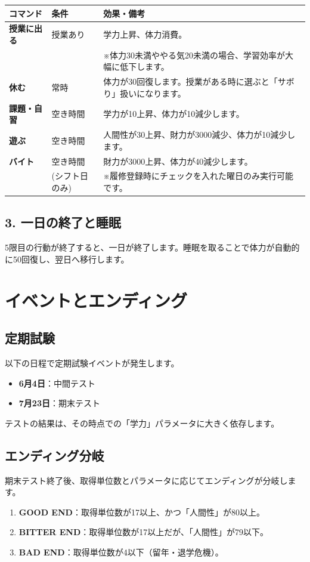 \documentclass[a4paper,11pt]{ltjsarticle}
\begin{document}
\begin{table}[h]
    \centering
    \begin{tabular}{llp{8cm}}
        \toprule
        \textbf{コマンド}  & \textbf{条件} & \textbf{効果・備考}                     \\
        \midrule
        \textbf{授業に出る} & 授業あり        & 学力上昇、体力消費。                         \\
                       &             & ※体力30未満ややる気20未満の場合、学習効率が大幅に低下します。  \\
        \textbf{休む}    & 常時          & 体力が30回復します。授業がある時に選ぶと「サボり」扱いになります。 \\
        \textbf{課題・自習} & 空き時間        & 学力が10上昇、体力が10減少します。                \\
        \textbf{遊ぶ}    & 空き時間        & 人間性が30上昇、財力が3000減少、体力が10減少します。     \\
        \textbf{バイト}   & 空き時間        & 財力が3000上昇、体力が40減少します。              \\
                       & (シフト日のみ)    & ※履修登録時にチェックを入れた曜日のみ実行可能です。         \\
        \bottomrule
    \end{tabular}
\end{table}

\subsection{3. 一日の終了と睡眠}
5限目の行動が終了すると、一日が終了します。睡眠を取ることで体力が自動的に50回復し、翌日へ移行します。

\section{イベントとエンディング}

\subsection{定期試験}
以下の日程で定期試験イベントが発生します。
\begin{itemize}
    \item \textbf{6月4日}：中間テスト
    \item \textbf{7月23日}：期末テスト
\end{itemize}
テストの結果は、その時点での「学力」パラメータに大きく依存します。

\subsection{エンディング分岐}
期末テスト終了後、取得単位数とパラメータに応じてエンディングが分岐します。

\begin{enumerate}
    \item \textbf{GOOD END}：取得単位数が17以上、かつ「人間性」が80以上。
    \item \textbf{BITTER END}：取得単位数が17以上だが、「人間性」が79以下。
    \item \textbf{BAD END}：取得単位数が4以下（留年・退学危機）。
\end{enumerate}
\end{document}
